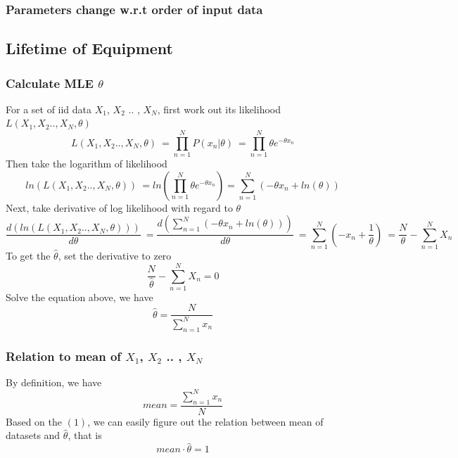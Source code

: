 \documentclass[11pt,a4paper]{article}
\newcommand{\htab}{\hspace*{0.63cm}}
\begin{document}
\subsubsection{Parameters change w.r.t order of input data}
\newpage


\subsection{Lifetime of Equipment}
\subsubsection{Calculate MLE $\hat{\theta}$}
\htab For a set of iid data $X_{1}$, $X_{2}$ .. , $X_{N}$, first work out its likelihood $ L(X_{1}, X_{2} .. , X_{N},\theta) $
    \begin{equation}
        L(X_{1}, X_{2} .. , X_{N},\theta) \
        = \prod_{n=1}^{N} P(x_{n}|\theta) \
        = \prod_{n=1}^{N} \theta e^{-\theta x_{n}} 
    \end{equation}
\htab Then take the logarithm of likelihood
    \begin{equation}
    ln(L(X_{1}, X_{2} .. , X_{N},\theta)) \
        = ln ( \prod_{n=1}^{N} \theta e^{-\theta x_{n}} )
        = \sum_{n=1}^{N} (- \theta x_{n} + ln(\theta)) 
    \end{equation}
\htab Next, take derivative of log likelihood with regard to $\theta$
    \begin{equation}
        \frac{d(ln(L(X_{1}, X_{2} .. , X_{N},\theta)))}{d\theta} \
        = \frac{d(\sum_{n=1}^{N} (- \theta x_{n} + ln(\theta)))}{d\theta} \ 
        = \sum_{n=1}^{N} (- x_{n} + \frac{1}{\theta}) \ 
        = \frac{N}{\theta} - \sum_{n=1}^{N} X_{n}
    \end{equation}
\htab To get the $\hat{\theta}$, set the derivative to zero
    \begin{equation}
        \frac{N}{\hat{\theta}} - \sum_{n=1}^{N} X_{n} = 0
    \end{equation}
\htab Solve the equation above, we have
    \begin{equation}
        \hat{\theta} = \frac{N}{\sum_{n=1}^{N} x_{n}}
    \end{equation}
\subsubsection{Relation to mean of $X_{1}$, $X_{2}$ .. , $X_{N}$}
\htab By definition, we have
    \begin{equation}
        mean = \frac{\sum_{n=1}^{N} x_{n}}{N} 
    \end{equation}
\htab Based on the $(1)$, we can easily figure out the relation between mean of datasets and $\hat{\theta}$, that is
    \begin{equation}
        mean \cdot \hat{\theta} = 1 
    \end{equation}
\end{document}
